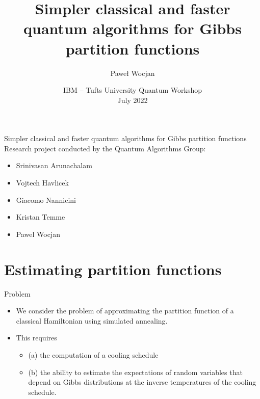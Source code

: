\documentclass{beamer}
\title[Partition functions]{Simpler classical and faster quantum algorithms for Gibbs partition functions}
\author{Pawe{\l} Wocjan}
\institute{IBM Quantum, IBM T.J. Watson Research Center}
\date{IBM -- Tufts University Quantum Workshop\\July 2022}
\renewcommand{\>}{\rangle}
\newcommand{\<}{\langle}
\begin{document}
\begin{frame}
  \titlepage
\end{frame}

\begin{frame}{Simpler classical and faster quantum algorithms for Gibbs partition functions}
    Research project conducted by the Quantum Algorithms Group:
    
    \medskip
    \begin{itemize}
        \item Srinivasan Arunachalam
        \item Vojtech Havlicek
        \item Giacomo Nannicini
        \item Kristan Temme
        \item Pawel Wocjan
    \end{itemize}
\end{frame}


\section{Estimating partition functions}

\begin{frame}{Problem}
\begin{itemize}
    \item We consider the problem of approximating the partition function of a classical Hamiltonian using simulated annealing.
    
    \medskip
    \item This requires 
    
    \medskip
    \begin{itemize}
        \item (a) the computation of a cooling schedule
        
        \medskip
        \item (b) the ability to estimate the expectations of random variables that depend on Gibbs distributions at the inverse temperatures of the cooling schedule.
    \end{itemize}
\end{itemize}
\end{frame}

%
\end{document}
